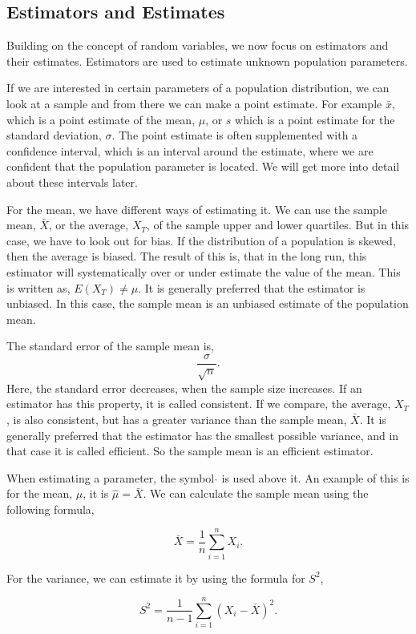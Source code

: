 \subsection{Estimators and Estimates}
Building on the concept of random variables, we now focus on estimators and their estimates. Estimators are used to estimate unknown population parameters. \newline

\noindent If we are interested in certain parameters of a population distribution, we can look at a sample and from there we can make a point estimate. For example $\bar{x}$, which is a point estimate of the mean, $\mu$, or $s$ which is a point estimate for the standard deviation, $\sigma$. The point estimate is often supplemented with a confidence interval, which is an interval around the estimate, where we are confident that the population parameter is located. We will get more into detail about these intervals later.
\newline

\noindent For the mean, we have different ways of estimating it. We can use the sample mean, $\bar{X}$, or the average, $X_T$, of the sample upper and lower quartiles. 
But in this case, we have to look out for bias. If the distribution of a population is skewed, then the average is biased. The result of this is, that in the long run, this estimator will systematically over or under estimate the value of the mean. This is written as, $E(X_T) \neq \mu$. It is generally preferred that the estimator is unbiased. In this case, the sample mean is an unbiased estimate of the population mean.
\newline

\noindent The standard error of the sample mean is,
\begin{equation}
 \frac{\sigma}{\sqrt{n}} .
\end{equation}
Here, the standard error decreases, when the sample size increases. If an estimator has this property, it is called consistent. If we compare, the average, $X_T$, is also consistent, but has a greater variance than the sample mean, $\bar{X}$. It is generally preferred that the estimator has the smallest possible variance, and in that case it is called efficient. So the sample mean is an efficient estimator.\newline

\noindent When estimating a parameter, the symbol $\hat{}$ is used above it. An example of this is for the mean, $\mu$, it is $\hat{\mu} = \bar{X}$. We can calculate the sample mean using the following formula,

\begin{equation}
	\bar{X}=\frac{1}{n} \sum_{i=1}^{n}X_i.
\end{equation}


\noindent For the variance, we can estimate it by using the formula for $S^2$,

\begin{equation}
	S^2=\frac{1}{n-1} \sum_{i=1}^{n}(X_i-\bar{X})^2.
\end{equation}

